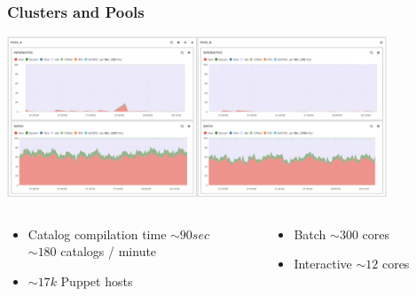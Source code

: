 \documentclass[aspectratio=169]{beamer}
\begin{document}
\begin{frame}

    \frametitle{Clusters and Pools}
    \begin{minipage}[t]{0.95\textwidth}
        \begin{center}
            \includegraphics[width=0.85\textwidth]{Puppet_Pools.png}
        \end{center}
    \end{minipage}
    \begin{minipage}[T]{0.95\textwidth}
        \begin{columns}
            \begin{column}{0.5\textwidth}
                \begin{itemize}
                    \item Catalog compilation time $\sim 90sec$ \\ $\sim 180$ 
                       catalogs / minute
                    \item $\sim 17k$ Puppet hosts
                \end{itemize}
            \end{column}
            \begin{column}{0.5\textwidth}
                \begin{itemize}
                    \item Batch $\sim 300$ cores
                    \item Interactive $\sim 12$ cores
                \end{itemize}
            \end{column}
        \end{columns}
    \end{minipage}

\end{frame}

\end{document}
